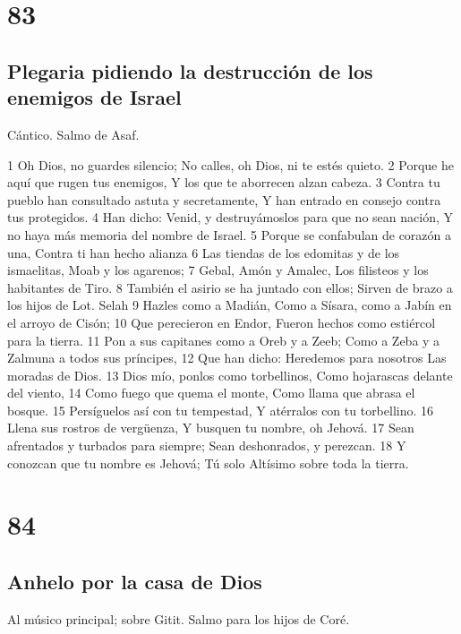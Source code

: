 \chapter{83}

\section*{Plegaria pidiendo la destrucción de los enemigos de Israel}

Cántico. Salmo de Asaf.

1 Oh Dios, no guardes silencio;
No calles, oh Dios, ni te estés quieto.
2 Porque he aquí que rugen tus enemigos,
Y los que te aborrecen alzan cabeza.
3 Contra tu pueblo han consultado astuta y secretamente,
Y han entrado en consejo contra tus protegidos.
4 Han dicho: Venid, y destruyámoslos para que no sean nación,
Y no haya más memoria del nombre de Israel.
5 Porque se confabulan de corazón a una,
Contra ti han hecho alianza
6 Las tiendas de los edomitas y de los ismaelitas,
Moab y los agarenos;
7 Gebal, Amón y Amalec,
Los filisteos y los habitantes de Tiro.
8 También el asirio se ha juntado con ellos;
Sirven de brazo a los hijos de Lot. Selah
9 Hazles como a Madián,
Como a Sísara, como a Jabín en el arroyo de Cisón;
10 Que perecieron en Endor,
Fueron hechos como estiércol para la tierra.
11 Pon a sus capitanes como a Oreb y a Zeeb;
Como a Zeba y a Zalmuna a todos sus príncipes,
12 Que han dicho: Heredemos para nosotros
Las moradas de Dios.
13 Dios mío, ponlos como torbellinos,
Como hojarascas delante del viento,
14 Como fuego que quema el monte,
Como llama que abrasa el bosque.
15 Persíguelos así con tu tempestad,
Y atérralos con tu torbellino.
16 Llena sus rostros de vergüenza,
Y busquen tu nombre, oh Jehová.
17 Sean afrentados y turbados para siempre;
Sean deshonrados, y perezcan.
18 Y conozcan que tu nombre es Jehová;
Tú solo Altísimo sobre toda la tierra.

\chapter{84}

\section*{Anhelo por la casa de Dios}

Al músico principal; sobre Gitit. Salmo para los hijos de Coré.

